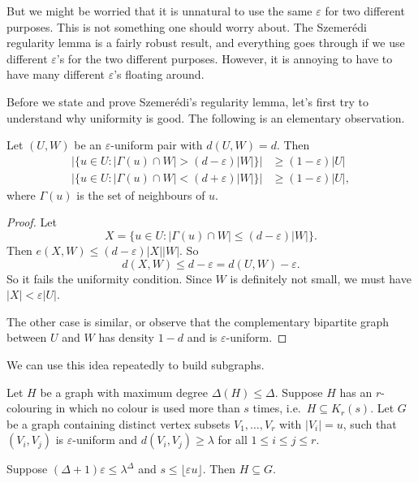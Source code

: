 \documentclass[a4paper]{article}
\begin{document}
But we might be worried that it is unnatural to use the same $\varepsilon$ for two different purposes. This is not something one should worry about. The Szemer\'edi regularity lemma is a fairly robust result, and everything goes through if we use different $\varepsilon$'s for the two different purposes. However, it is annoying to have to have many different $\varepsilon$'s floating around. 

Before we state and prove Szemer\'edi's regularity lemma, let's first try to understand why uniformity is good. The following is an elementary observation.
\begin{lemma}
  Let $(U, W)$ be an $\varepsilon$-uniform pair with $d(U, W) = d$. Then
  \begin{align*}
    |\{u \in U: |\Gamma(u) \cap W| > (d - \varepsilon) |W|\}| &\geq (1 - \varepsilon)|U|\\
    |\{u \in U: |\Gamma(u) \cap W| < (d + \varepsilon) |W|\}| &\geq (1 - \varepsilon)|U|,
  \end{align*}
  where $\Gamma(u)$ is the set of neighbours of $u$.
\end{lemma}

\begin{proof}
  Let
  \[
    X = \{u \in U: |\Gamma(u) \cap W| \leq (d - \varepsilon)|W|\}.
  \]
  Then $e(X, W) \leq (d - \varepsilon) |X||W|$. So
  \[
    d(X, W) \leq d - \varepsilon = d(U, W) - \varepsilon.
  \]
  So it fails the uniformity condition. Since $W$ is definitely not small, we must have $|X| < \varepsilon |U|$.

  The other case is similar, or observe that the complementary bipartite graph between $U$ and $W$ has density $1 - d$ and is $\varepsilon$-uniform.
\end{proof}

We can use this idea repeatedly to build subgraphs.
\begin{lemma}
  Let $H$ be a graph with maximum degree $\Delta(H) \leq \Delta$. Suppose $H$ has an $r$-colouring in which no colour is used more than $s$ times, i.e.\ $H \subseteq K_r(s)$. Let $G$ be a graph containing distinct vertex subsets $V_1, \ldots, V_r$ with $|V_i| = u$, such that $(V_i, V_j)$ is $\varepsilon$-uniform and $d(V_i, V_j) \geq \lambda$ for all $1 \leq i \leq j \leq r$.

  Suppose $(\Delta + 1) \varepsilon \leq \lambda^\Delta$ and $s \leq \lfloor \varepsilon u\rfloor$. Then $H \subseteq G$.
\end{lemma}
\end{document}
